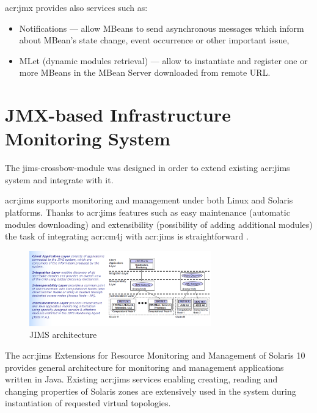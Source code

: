 \documentclass[11pt,openany]{book}
\begin{document}
      \gls{acr:jmx} provides also services such as:

      \begin{itemize}
        \item Notifications --- allow MBeans to send asynchronous messages which inform about MBean's state change,
                                event occurrence or other important issue,
        \item MLet (dynamic modules retrieval) --- allow to instantiate and register one or more MBeans in the MBean
                                                   Server downloaded from remote URL.
      \end{itemize}


    \section{JMX-based Infrastructure Monitoring System}

      The jims-crossbow-module was designed in order to extend existing \gls{acr:jims} system and integrate with it.

      \gls{acr:jims} supports monitoring and management under both Linux and Solaris platforms. Thanks to \gls{acr:jims}
      features such as easy maintenance (automatic modules downloading) and extensibility (possibility of adding
      additional modules) the task of integrating \gls{acr:cm4j} with \gls{acr:jims} is straightforward \cite{jims}.
    
      \begin{figure}[H]
        \begin{center}
          \includegraphics[width=0.7\textwidth]{img/jims/jims.png}
        \end{center}
        \caption{JIMS architecture \cite{jims}}
      \end{figure}

      The \gls{acr:jims} Extensions for Resource Monitoring and Management of Solaris 10 provides general architecture
      for monitoring and management applications written in Java. Existing \gls{acr:jims} services enabling creating,
      reading and changing properties of Solaris zones are extensively used in the system during instantiation of
      requested virtual topologies.
\end{document}
